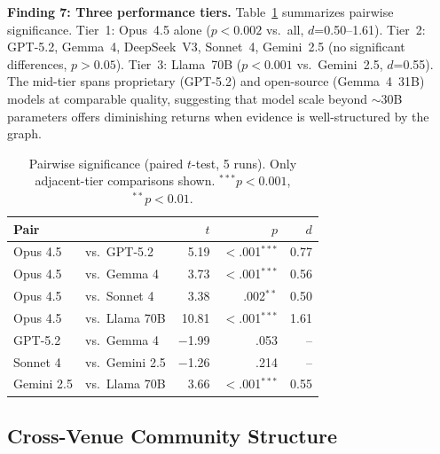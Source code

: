 \documentclass[conference]{IEEEtran}
\begin{document}
\textbf{Finding 7: Three performance tiers.}
Table~\ref{tab:significance} summarizes pairwise significance.
Tier~1: Opus~4.5 alone ($p<0.002$ vs.\ all, $d$=0.50--1.61).
Tier~2: GPT-5.2, Gemma~4, DeepSeek~V3, Sonnet~4, Gemini~2.5 (no significant differences, $p>0.05$).
Tier~3: Llama~70B ($p<0.001$ vs.\ Gemini~2.5, $d$=0.55).
The mid-tier spans proprietary (GPT-5.2) and open-source (Gemma~4~31B) models at comparable quality, suggesting that model scale beyond ${\sim}$30B parameters offers diminishing returns when evidence is well-structured by the graph.

\begin{table}[t]
\caption{Pairwise significance (paired $t$-test, 5 runs). Only adjacent-tier comparisons shown. $^{***}p<0.001$, $^{**}p<0.01$.}
\label{tab:significance}
\centering
\footnotesize
\setlength{\tabcolsep}{3pt}
\begin{tabular}{llrrr}
\toprule
\textbf{Pair} & & \textbf{$t$} & \textbf{$p$} & \textbf{$d$} \\
\midrule
Opus 4.5 & vs.\ GPT-5.2 & 5.19 & $<$.001$^{***}$ & 0.77 \\
Opus 4.5 & vs.\ Gemma 4 & 3.73 & $<$.001$^{***}$ & 0.56 \\
Opus 4.5 & vs.\ Sonnet 4 & 3.38 & .002$^{**}$ & 0.50 \\
Opus 4.5 & vs.\ Llama 70B & 10.81 & $<$.001$^{***}$ & 1.61 \\
\midrule
GPT-5.2 & vs.\ Gemma 4 & $-$1.99 & .053 & -- \\
Sonnet 4 & vs.\ Gemini 2.5 & $-$1.26 & .214 & -- \\
\midrule
Gemini 2.5 & vs.\ Llama 70B & 3.66 & $<$.001$^{***}$ & 0.55 \\
\bottomrule
\end{tabular}
\end{table}


\subsection{Cross-Venue Community Structure}
\end{document}
